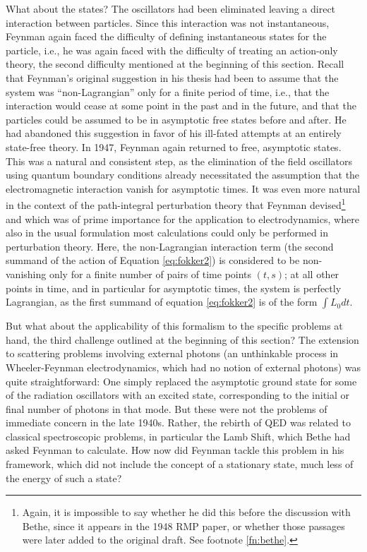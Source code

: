 \documentclass[12pt,a4paper]{article}
\begin{document}
What about the states? The oscillators had been eliminated leaving a direct interaction between particles. Since this interaction was not instantaneous, Feynman again faced the difficulty of defining instantaneous states for the particle, i.e., he was again faced with the difficulty of treating an action-only theory, the second difficulty mentioned at the beginning of this section. Recall that Feynman's original suggestion in his thesis had been to assume that the system was ``non-Lagrangian'' only for a finite period of time, i.e., that the interaction would cease at some point in the past and in the future, and that the particles could be assumed to be in asymptotic free states before and after. He had abandoned this suggestion in favor of his ill-fated attempts at an entirely state-free theory. In 1947, Feynman again returned to free, asymptotic states. This was a natural and consistent step, as the elimination of the field oscillators using quantum boundary conditions already necessitated the assumption that the electromagnetic interaction vanish for asymptotic times. It was even more natural in the context of the path-integral perturbation theory that Feynman devised\footnote{Again, it is impossible to say whether he did this before the discussion with Bethe, since it appears in the 1948 RMP paper, or whether those passages were later added to the original draft. See footnote \ref{fn:bethe}.} and which was of prime importance for the application to electrodynamics, where also in the usual formulation most calculations could only be performed in perturbation theory. Here, the non-Lagrangian interaction term (the second summand of the action of Equation \ref{eq:fokker2}) is considered to be non-vanishing only for a finite number of pairs of time points $(t,s)$; at all other points in time, and in particular for asymptotic times, the system is perfectly Lagrangian, as the first summand of equation \ref{eq:fokker2} is of the form $\int L_0 dt$.

But what about the applicability of this formalism to the specific problems at hand, the third challenge outlined at the beginning of this section? The extension to scattering problems involving external photons (an unthinkable process in Wheeler-Feynman electrodynamics, which had no notion of external photons) was quite straightforward: One simply replaced the asymptotic ground state for some of the radiation oscillators with an excited state, corresponding to the initial or final number of photons in that mode. But these were not the problems of immediate concern in the late 1940s. Rather, the rebirth of QED was related to classical spectroscopic problems, in particular the Lamb Shift, which Bethe had asked Feynman to calculate. How now did Feynman tackle this problem in his framework, which did not include the concept of a stationary state, much less of the energy of such a state?
\end{document}
